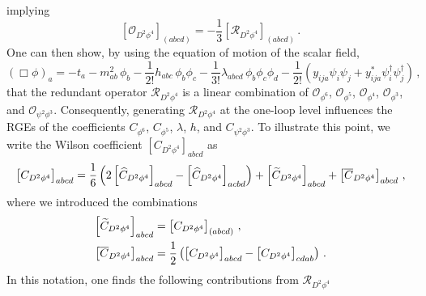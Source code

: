 implying
\begin{equation}
\left[\mathcal O_{D^2\phi^4}\right]_{(abcd)} = -\frac{1}{3}\left[\mathcal R_{D^2\phi^4}\right]_{(abcd)}\,.
\end{equation}
One can then show, by using the equation of motion of the scalar field,
\begin{equation}
    (\Box \phi)_a = -t_a -m^2_{ab}\,\phi_b - \frac{1}{2!}h_{abc}\,\phi_b\phi_c - \frac{1}{3!}\lambda_{abcd}\,\phi_b\phi_c\phi_d
    -\frac{1}{2!}\left(y_{ija}\psi_i \psi_j + y_{ija}^* \psi_i^\dagger \psi_j^\dagger
    \right)
    \,,
\end{equation}
that the redundant operator $\mathcal R_{D^2\phi^4}$ is a linear combination of $\mathcal O_{\phi^6}$, $\mathcal O_{\phi^5}$, $\mathcal O_{\phi^4}$, $\mathcal O_{\phi^3}$, and $\mathcal O_{\psi^2\phi^3}$.
Consequently, generating $\mathcal R_{D^2\phi^4}$ at the one-loop level influences the RGEs of the coefficients $C_{\phi^6}$, $C_{\phi^5}$, $\lambda$, $h$, and $C_{\psi^2\phi^3}$.
To illustrate this point, we write the Wilson coefficient $[C_{D^2\phi^4}]_{abcd}$ as
\begin{equation}
    \left[C_{D^2\phi^4}\right]_{abcd} = \frac{1}{6}\left(
    2\left[\widehat C_{D^2\phi^4}\right]_{abcd}-\left[\widehat C_{D^2\phi^4}\right]_{acbd}
    \right)+\left[\widetilde{C}_{D^2\phi^4}\right]_{abcd}+\left[\overline C_{D^2\phi^4}\right]_{abcd}\,,
    \label{eq:decomposition}
\end{equation}
where we introduced the combinations
\begin{align}
    \left[\widetilde{C}_{D^2\phi^4}\right]_{abcd} &= \left[ C_{D^2\phi^4}\right]_{(abcd)}\,,\label{eq:Ctilde_def}\\
    \left[\overline C_{D^2\phi^4}\right]_{abcd} &= \frac{1}{2}\left(
    \left[C_{D^2\phi^4}\right]_{abcd} - \left[C_{D^2\phi^4}\right]_{cdab}
    \right)\,.\label{eq:Cbar_def}
\end{align}
In this notation, one finds the following contributions from $\mathcal R_{D^2\phi^4}$

